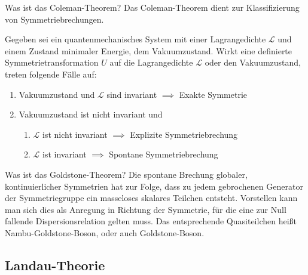
\begin{fquestion}{Was ist das Coleman-Theorem?}
    Das Coleman-Theorem dient zur Klassifizierung von Symmetriebrechungen.

    Gegeben sei ein quantenmechanisches System mit einer Lagrangedichte $\mathcal{L}$ und einem Zustand minimaler Energie, dem Vakuumzustand.
    Wirkt eine definierte Symmetrietransformation $U$ auf die Lagrangedichte $\mathcal{L}$ oder den Vakuumzustand, treten folgende Fälle auf:
    \begin{enumerate}
        \item Vakuumzustand und $\mathcal{L}$ sind invariant $\implies$ Exakte Symmetrie
        \item Vakuumzustand ist nicht invariant und
        \begin{enumerate}
            \item  $\mathcal{L}$ ist nicht invariant $\implies$ Explizite Symmetriebrechung
            \item $\mathcal{L}$ ist invariant  $\implies$ Spontane Symmetriebrechung
        \end{enumerate}
    \end{enumerate}
\end{fquestion}

\begin{fquestion}{Was ist das Goldstone-Theorem?}
    Die spontane Brechung globaler, kontinuierlicher Symmetrien hat zur Folge, dass zu jedem gebrochenen Generator der Symmetriegruppe ein masseloses skalares Teilchen entsteht.
    Vorstellen kann man sich dies als Anregung in Richtung der Symmetrie, für die eine zur Null fallende Dispersionsrelation gelten muss.
    Das entsprechende Quasiteilchen heißt Nambu-Goldstone-Boson, oder auch Goldstone-Boson.
\end{fquestion}

\subsection{Landau-Theorie}

